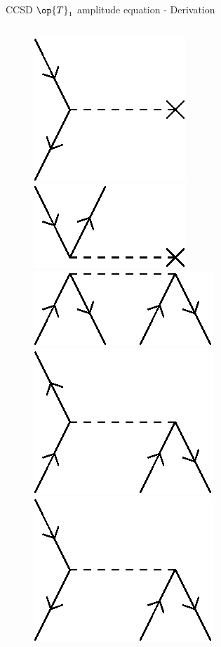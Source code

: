 \begin{frame}{CCSD $\op{T}_1$ amplitude equation - Derivation }
\begin{columns}[t]
\begin{figure}
        \parbox{0.20\textwidth}{
            \centering
            \includegraphics[scale=0.35]{graphics/f3}} 
        \parbox{0.20\textwidth}{
            \centering
            \includegraphics[scale=0.35]{graphics/f4}} 
        \parbox{0.20\textwidth}{
            \centering
            \includegraphics[scale=0.35]{graphics/v1}} 
        \parbox{0.20\textwidth}{
            \centering
            \includegraphics[scale=0.35]{graphics/v2}} 
        \parbox{0.20\textwidth}{
            \centering
            \includegraphics[scale=0.35]{graphics/v3}} 

\end{figure}
\end{columns}
\end{frame}
